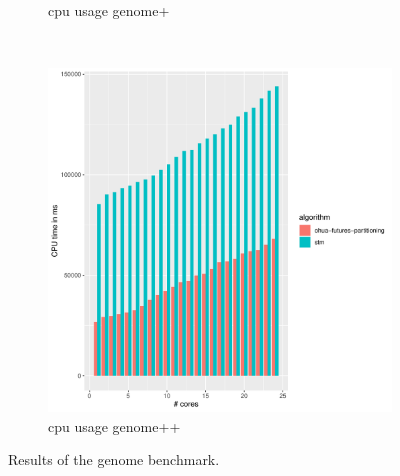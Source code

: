 \begin{figure}
\begin{subfigure}[t]{.32\textwidth}
        \caption{cpu usage genome+}%
    \end{subfigure}%
    ~
    \begin{subfigure}[t]{.32\textwidth}
        \includegraphics[width=\textwidth,keepaspectratio]{gfx/results/genome/genome++_cpu}
        \caption{cpu usage genome++}%
    \end{subfigure}%
    \caption{Results of the genome benchmark.}%
    \label{fig:evaulation:genome}
\end{figure}

